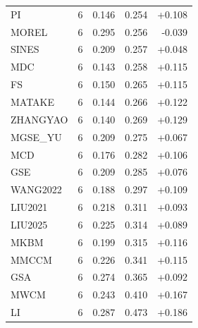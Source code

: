 \begin{tabular}{lrrrr}
PI & 6 & 0.146 & 0.254 & +0.108 \\
MOREL & 6 & 0.295 & 0.256 & -0.039 \\
SINES & 6 & 0.209 & 0.257 & +0.048 \\
MDC & 6 & 0.143 & 0.258 & +0.115 \\
FS & 6 & 0.150 & 0.265 & +0.115 \\
MATAKE & 6 & 0.144 & 0.266 & +0.122 \\
ZHANGYAO & 6 & 0.140 & 0.269 & +0.129 \\
MGSE_YU & 6 & 0.209 & 0.275 & +0.067 \\
MCD & 6 & 0.176 & 0.282 & +0.106 \\
GSE & 6 & 0.209 & 0.285 & +0.076 \\
WANG2022 & 6 & 0.188 & 0.297 & +0.109 \\
LIU2021 & 6 & 0.218 & 0.311 & +0.093 \\
LIU2025 & 6 & 0.225 & 0.314 & +0.089 \\
MKBM & 6 & 0.199 & 0.315 & +0.116 \\
MMCCM & 6 & 0.226 & 0.341 & +0.115 \\
GSA & 6 & 0.274 & 0.365 & +0.092 \\
MWCM & 6 & 0.243 & 0.410 & +0.167 \\
LI & 6 & 0.287 & 0.473 & +0.186 \\
\hline
\end{tabular}

